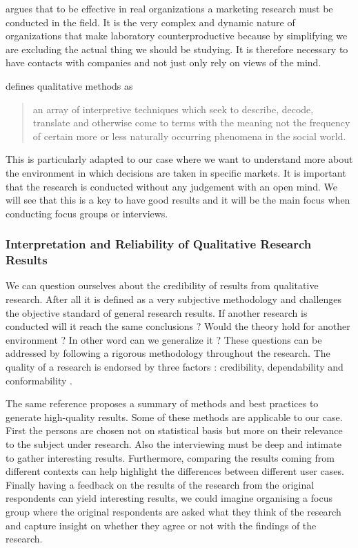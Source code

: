 \documentclass[10pt]{report}
\begin{document}
\autocite{mintzberg1979} argues that to be effective in real organizations a marketing research must be conducted in the field. It is the very complex and dynamic nature of organizations that make laboratory counterproductive because by simplifying we are excluding the actual thing we should be studying. It is therefore necessary to have contacts with companies and not just only rely on views of the mind.

\autocite{van1979reclaiming} defines qualitative methods as 
\begin{quote}
an array of interpretive techniques which seek to describe, decode, translate and otherwise come to terms with the meaning not the frequency of certain more or less naturally occurring phenomena in the social world.
\end{quote}
This is particularly adapted to our case where we want to understand more about the environment in which decisions are taken in specific markets. It is important that the research is conducted without any judgement with an open mind. We will see that this is a key to have good results and it will be the main focus when conducting focus groups or interviews.

\subsubsection{Interpretation and Reliability of Qualitative Research Results}
We can question ourselves about the credibility of results from qualitative research. After all it is defined as a very subjective methodology and challenges the objective standard of general research results. If another research is conducted will it reach the same conclusions ? Would the theory hold for another environment ? In other word can we generalize it ? These questions can be addressed by following a rigorous methodology throughout the research. The quality of a research is endorsed by three factors : credibility, dependability and conformability \autocite{carson2001}.

The same reference proposes a summary of methods and best practices to generate high-quality results. Some of these methods are applicable to our case. First the persons are chosen not on statistical basis but more on their relevance to the subject under research. Also the interviewing must be deep and intimate to gather interesting results. Furthermore, comparing the results coming from different contexts can help highlight the differences between different user cases. Finally having a feedback on the results of the research from the original respondents can yield interesting results, we could imagine organising a focus group where the original respondents are asked what they think of the research and capture insight on whether they agree or not with the findings of the research.
\end{document}
